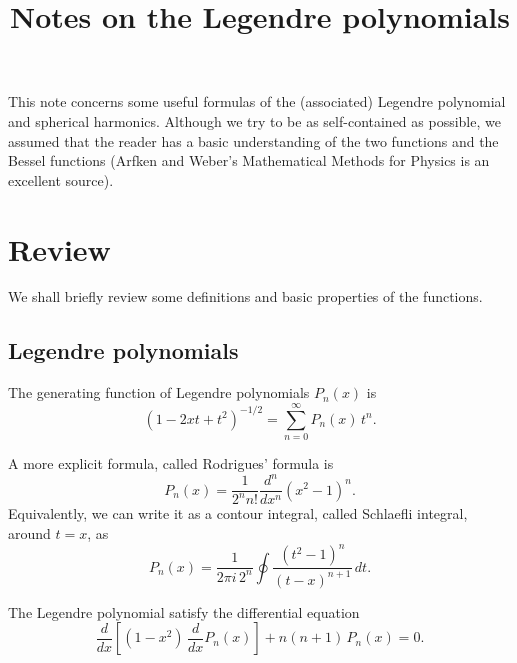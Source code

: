 \documentclass[11pt]{article}
\begin{document}
\title{Notes on the Legendre polynomials}
\author{ \vspace{-10ex} }
\date{ \vspace{-10ex} }
\maketitle



This note concerns some useful formulas of
the (associated) Legendre polynomial
and spherical harmonics.
%
Although we try to be as self-contained as possible,
we assumed that the reader
has a basic understanding of the two functions
and the Bessel functions
(Arfken and Weber's Mathematical Methods for Physics\cite{arfken}
is an excellent source).



\section{Review}



We shall briefly review some definitions and basic properties of the functions.



\subsection{Legendre polynomials}



The generating function of Legendre polynomials $P_n(x)$ is
%
\begin{equation}
  (1 - 2 x t + t^2)^{-1/2}
=
  \sum_{n = 0}^\infty P_n(x) \, t^n.
  \label{eq:legendre_gf}
\end{equation}

A more explicit formula, called Rodrigues' formula is
%
\begin{equation}
  P_n(x)
=
  \frac{1}{2^n n!}
  \frac{d^n}{dx^n}
  (x^2 - 1)^n.
  \label{eq:legendre_rodrigues}
\end{equation}
%
Equivalently, we can write it as a contour integral,
called Schlaefli integral, around $t = x$, as
\begin{equation}
  P_n(x)
=
  \frac{1}{2\pi i \, 2^n}
  \oint
  \frac{ (t^2 - 1)^n } { (t - x)^{n+1} } \, dt.
  \label{eq:legendre_schlaefli}
\end{equation}


The Legendre polynomial satisfy the differential equation
\begin{equation}
  \frac{d}{dx}
  \left[
    (1 - x^2) \, \frac{d}{dx} P_n(x)
  \right]
+ n (n + 1) \, P_n(x) = 0.
\label{eq:legendre_diffeq}
\end{equation}
\end{document}

